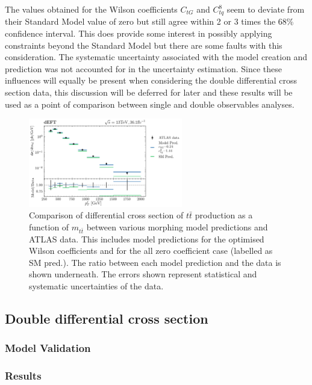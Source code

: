 \documentclass[a4paper,11pt]{article}
\begin{document}
The values obtained for the Wilson coefficients $C_{tG}$ and $C_{tq}^{8}$ seem to deviate from their Standard Model value of zero but still agree within 2 or 3 times the 68\% confidence interval.
This does provide some interest in possibly applying constraints beyond the Standard Model but there are some faults with this consideration.
The systematic uncertainty associated with the model creation and prediction was not accounted for in the uncertainty estimation.
Since these influences will equally be present when considering the double differential cross section data, this discussion will be deferred for later and these results will be used as a point of comparison between single and double observables analyses.


\begin{figure}[htb]
    \centering
    \includegraphics[width=0.6\textwidth]{plots/ATLAS_model_result_1D_2OP.png}
    \caption{Comparison of differential cross section of $t\bar{t}$ production as a function of $m_{t\bar{t}}$ between various morphing model predictions and ATLAS data. This includes model predictions for the optimised Wilson coefficients and for the all zero coefficient case (labelled as SM pred.). The ratio between each model prediction and the data is shown underneath. The errors shown represent statistical and systematic uncertainties of the data.}
    \label{fig:model_result_1D_2OP}
\end{figure}


\subsection{Double differential cross section}
\subsubsection{Model Validation}
\subsubsection{Results}
\end{document}
